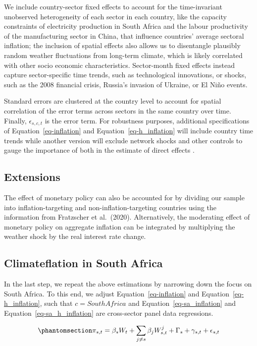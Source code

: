 \documentclass[
  letterpaper,
  DIV=11,
  numbers=noendperiod]{scrartcl}
\begin{document}
We include country-sector fixed effects to account for the
time-invariant unobserved heterogeneity of each sector in each country,
like the capacity constraints of electricity production in South Africa
and the labour productivity of the manufacturing sector in China, that
influence countries' average sectoral inflation; the inclusion of
spatial effects also allows us to disentangle plausibly random weather
fluctuations from long-term climate, which is likely correlated with
other socio economic characteristics. Sector-month fixed effects instead
capture sector-specific time trends, such as technological innovations,
or shocks, such as the 2008 financial crisis, Russia's invasion of
Ukraine, or El Niño events.

Standard errors are clustered at the country level to account for
spatial correlation of the error terms across sectors in the same
country over time. Finally, \(\epsilon_{s,c,t}\) is the error term. For
robustness purposes, additional specifications of
Equation~\ref{eq-inflation} and Equation~\ref{eq-h_inflation} will
include country time trends while another version will exclude network
shocks and other controls to gauge the importance of both in the
estimate of direct effects .

\subsection{Extensions}\label{extensions}

The effect of monetary policy can also be accounted for by dividing our
sample into inflation-targeting and non-inflation-targeting countries
using the information from Fratzscher et al.~(2020). Alternatively, the
moderating effect of monetary policy on aggregate inflation can be
integrated by multiplying the weather shock by the real interest rate
change.

\subsection{Climateflation in South
Africa}\label{climateflation-in-south-africa}

In the last step, we repeat the above estimations by narrowing down the
focus on South Africa. To this end, we adjust
Equation~\ref{eq-inflation} and Equation~\ref{eq-h_inflation}, such that
\(c = South Africa\) and Equation~\ref{eq-sa_inflation} and
Equation~\ref{eq-sa_h_inflation} are cross-sector panel data
regressions.

\begin{equation}\phantomsection\label{eq-sa_inflation}{
\pi_{s,t} = \beta_sW_t + \sum_{j\neq s} \beta_j W_{s,t}^j + \Gamma_s + \gamma_{s,t} + \epsilon_{s,t}                    
}\end{equation}
\end{document}
